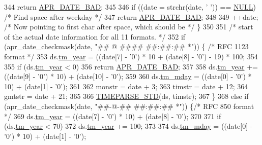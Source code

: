 \begin{DoxyCode}
344             \textcolor{keywordflow}{return} \hyperlink{group__APR__Util__Date_ga8be88b25f4b477ad13c4067c959411b0}{APR\_DATE\_BAD};
345 
346         \textcolor{keywordflow}{if} ((date = strchr(date, \textcolor{charliteral}{' '})) == \hyperlink{pcre_8txt_ad7f989d16aa8ca809a36bc392c07fba1}{NULL})   \textcolor{comment}{/* Find space after weekday */}
347             \textcolor{keywordflow}{return} \hyperlink{group__APR__Util__Date_ga8be88b25f4b477ad13c4067c959411b0}{APR\_DATE\_BAD};
348 
349         ++date;    \textcolor{comment}{/* Now pointing to first char after space, which should be */}    \}
350 
351     \textcolor{comment}{/* start of the actual date information for all 11 formats. */}
352     \textcolor{keywordflow}{if} (apr\_date\_checkmask(date, \textcolor{stringliteral}{"## @$$ #### ##:##:## *"})) \{   \textcolor{comment}{/* RFC 1123 format */}
353         ds.\hyperlink{structapr__time__exp__t_a35c32245be49279a6689e34bcd6e534a}{tm\_year} = ((date[7] - \textcolor{charliteral}{'0'}) * 10 + (date[8] - \textcolor{charliteral}{'0'}) - 19) * 100;
354 
355         \textcolor{keywordflow}{if} (ds.\hyperlink{structapr__time__exp__t_a35c32245be49279a6689e34bcd6e534a}{tm\_year} < 0)
356             \textcolor{keywordflow}{return} \hyperlink{group__APR__Util__Date_ga8be88b25f4b477ad13c4067c959411b0}{APR\_DATE\_BAD};
357 
358         ds.\hyperlink{structapr__time__exp__t_a35c32245be49279a6689e34bcd6e534a}{tm\_year} += ((date[9] - \textcolor{charliteral}{'0'}) * 10) + (date[10] - \textcolor{charliteral}{'0'});
359 
360         ds.\hyperlink{structapr__time__exp__t_a6c09a274f011841e9e988c3c9504848a}{tm\_mday} = ((date[0] - \textcolor{charliteral}{'0'}) * 10) + (date[1] - \textcolor{charliteral}{'0'});
361 
362         monstr = date + 3;
363         timstr = date + 12;
364         gmtstr = date + 21;
365 
366         \hyperlink{apr__date_8c_a574f7cc7ba24c017bff5d6c41cf5903d}{TIMEPARSE\_STD}(ds, timstr);
367     \}
368     \textcolor{keywordflow}{else} \textcolor{keywordflow}{if} (apr\_date\_checkmask(date, \textcolor{stringliteral}{"##-@$$-## ##:##:## *"})) \{\textcolor{comment}{/* RFC 850 format  */}
369         ds.\hyperlink{structapr__time__exp__t_a35c32245be49279a6689e34bcd6e534a}{tm\_year} = ((date[7] - \textcolor{charliteral}{'0'}) * 10) + (date[8] - \textcolor{charliteral}{'0'});
370 
371         \textcolor{keywordflow}{if} (ds.\hyperlink{structapr__time__exp__t_a35c32245be49279a6689e34bcd6e534a}{tm\_year} < 70)
372             ds.\hyperlink{structapr__time__exp__t_a35c32245be49279a6689e34bcd6e534a}{tm\_year} += 100;
373 
374         ds.\hyperlink{structapr__time__exp__t_a6c09a274f011841e9e988c3c9504848a}{tm\_mday} = ((date[0] - \textcolor{charliteral}{'0'}) * 10) + (date[1] - \textcolor{charliteral}{'0'});

\end{DoxyCode}

